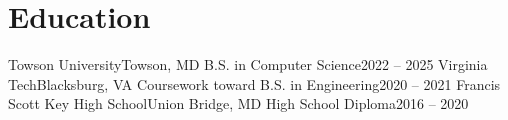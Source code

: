 \section{Education}
  \resumeSubHeadingListStart
    \resumeSubheading
      {Towson University}{Towson, MD}
      {B.S. in Computer Science}{2022 -- 2025}
      \resumeItemListStart
      \resumeItemListEnd
    \resumeSubheading
      {Virginia Tech}{Blacksburg, VA}
      {Coursework toward B.S. in Engineering}{2020 -- 2021}
      \resumeItemListStart
      \resumeItemListEnd
    \resumeSubheading
      {Francis Scott Key High School}{Union Bridge, MD}
      {High School Diploma}{2016 -- 2020}
      \resumeItemListStart
      \resumeItemListEnd
  \resumeSubHeadingListEnd
